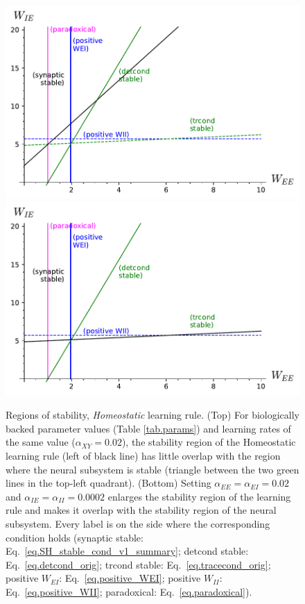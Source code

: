 \documentclass[twocolumn]{article}
\newcommand{\EE}{\mathit{EE}}
\newcommand{\EI}{\mathit{EI}}
\newcommand{\IE}{\mathit{IE}}
\newcommand{\II}{\mathit{II}}
\newcommand{\XY}{\mathit{XY}}
\begin{document}
\begin{figure}[!ht]
\centering
\includegraphics[width=\linewidth]{SH_stability}
\includegraphics[width=\linewidth]{SH_stability_slowInh.pdf}
\caption{Regions of stability, {\em Homeostatic} learning rule. (Top) For biologically backed parameter values (Table \ref{tab.params}) and learning rates of the same value ($\alpha_{\XY} = 0.02$), the stability region of the Homeostatic learning rule (left of black line) has little overlap with the region where the neural subsystem is stable (triangle between the two green lines in the top-left quadrant). (Bottom) Setting $\alpha_{\EE}=\alpha_{\EI}=0.02$ and $\alpha_{\IE}=\alpha_{\II}=0.0002$ enlarges the stability region of the learning rule and makes it overlap with the stability region of the neural subsystem.
Every label is on the side where the corresponding condition holds (synaptic stable: Eq.\ \ref{eq.SH_stable_cond_v1_summary}; detcond stable: Eq.\ \ref{eq.detcond_orig}; trcond stable: Eq.\ \ref{eq.tracecond_orig}; positive $W_{\EI}$: Eq.\ \ref{eq.positive_WEI}; positive $W_{\II}$: Eq.\ \ref{eq.positive_WII}; paradoxical: Eq.\ \ref{eq.paradoxical}).}
\label{fig.SH_stability}
\end{figure}
\end{document}
